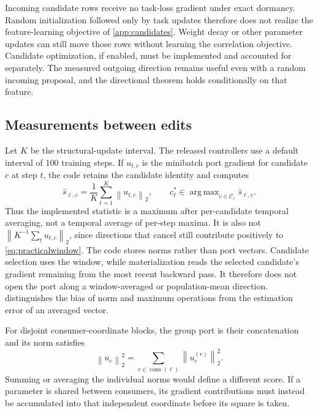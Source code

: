 \documentclass[10pt]{article}
\theoremstyle{paper}
\newcommand{\norm}[1]{\left\lVert #1\right\rVert}
\DeclareMathOperator*{\argmax}{arg\,max}
\begin{document}
Incoming candidate rows receive no task-loss gradient under exact dormancy. Random initialization followed only by task updates therefore does not realize the feature-learning objective of \cref{app:candidates}. Weight decay or other parameter updates can still move those rows without learning the correlation objective. Candidate optimization, if enabled, must be implemented and accounted for separately. The measured outgoing direction remains useful even with a random incoming proposal, and the directional theorem holds conditionally on that feature.

\subsection{Measurements between edits}
\label{app:measurements}
Let $K$ be the structural-update interval. The released controllers use a default interval of 100 training steps. If $u_{t,c}$ is the minibatch port gradient for candidate $c$ at step $t$, the code retains the candidate identity and computes
\begin{equation}
\widehat s_{\ell,c}=\frac1K\sum_{t=1}^K\norm{u_{t,c}}_2,
\qquad c_\ell^*\in\argmax_{c\in\mathcal C_\ell}\widehat s_{\ell,c}.
\label{eq:practicalwindow}
\end{equation}
Thus the implemented statistic is a maximum after per-candidate temporal averaging, not a temporal average of per-step maxima. It is also not $\norm{K^{-1}\sum_tu_{t,c}}_2$, since directions that cancel still contribute positively to \cref{eq:practicalwindow}. The code stores norms rather than port vectors. Candidate selection uses the window, while materialization reads the selected candidate's gradient remaining from the most recent backward pass. It therefore does not open the port along a window-averaged or population-mean direction.  distinguishes the bias of norm and maximum operations from the estimation error of an averaged vector.

For disjoint consumer-coordinate blocks, the group port is their concatenation and its norm satisfies
\[
\norm{u_c}_2^2=\sum_{r\in\operatorname{cons}(\ell)}\norm{u_c^{(r)}}_2^2.
\]
Summing or averaging the individual norms would define a different score. If a parameter is shared between consumers, its gradient contributions must instead be accumulated into that independent coordinate before its square is taken.
\end{document}
